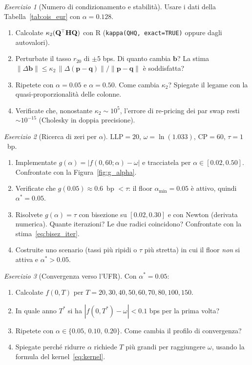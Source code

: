 \documentclass[11pt,a4paper]{article}
\theoremstyle{plain}
\theoremstyle{definition}
\theoremstyle{remark}
\newtheorem{esercizio}{Esercizio}[section]
\newcommand{\LLP}{\ensuremath{\mathrm{LLP}}}
\newcommand{\CP}{\ensuremath{\mathrm{CP}}}
\newcommand{\bfb}{\mathbf{b}}
\newcommand{\bfp}{\mathbf{p}}
\newcommand{\bfq}{\mathbf{q}}
\newcommand{\Hmat}{\mathbf{H}}
\newcommand{\Qmat}{\mathbf{Q}}
\newcommand{\transp}{^{\mskip-1mu\top}}
\newcommand{\abs}[1]{\left\lvert #1 \right\rvert}
\begin{document}
\begin{esercizio}[Numero di condizionamento e stabilit\`a]
Usare i dati della Tabella~\ref{tab:ois_eur} con $\alpha=0.128$.
\begin{enumerate}[label=(\alph*)]
  \item Calcolate $\kappa_2(\Qmat\transp\Hmat\Qmat)$ con R
        (\texttt{kappa(QHQ, exact=TRUE)} oppure dagli autovalori).
  \item Perturbate il tasso $r_{20}$ di $\pm 5$ bps. Di quanto cambia $\bfb$?
        La stima $\|\Delta\bfb\| \le \kappa_2\,\|\Delta(\bfp-\bfq)\|/\|\bfp-\bfq\|$
        \`e soddisfatta?
  \item Ripetete con $\alpha=0.05$ e $\alpha=0.50$. Come cambia $\kappa_2$?
        Spiegate il legame con la quasi-proporzionalità delle colonne.
  \item Verificate che, nonostante $\kappa_2\sim 10^5$, l'errore di re-pricing dei
        par swap resti $\sim 10^{-15}$ (Cholesky in doppia precisione).
\end{enumerate}
\end{esercizio}

\begin{esercizio}[Ricerca di zeri per $\alpha$]
$\LLP=20$, $\omega=\ln(1.033)$, $\CP=60$, $\tau=1$~bp.
\begin{enumerate}[label=(\alph*)]
  \item Implementate $g(\alpha) = \abs{f(0,60;\alpha) - \omega}$ e tracciatela
        per $\alpha \in [0.02, 0.50]$. Confrontate con la Figura~\ref{fig:g_alpha}.
  \item Verificate che $g(0.05)\approx 0.6$~bp $<\tau$: il floor $\alpha_{\min}=0.05$
        è attivo, quindi $\alpha^*=0.05$.
  \item Risolvete $g(\alpha)=\tau$ con bisezione su $[0.02,0.30]$ e con Newton
        (derivata numerica). Quante iterazioni? Le due radici coincidono?
        Confrontate con la stima~\eqref{eq:bisez_iter}.
  \item Costruite uno scenario (tassi più ripidi o $\tau$ più stretta) in cui il
        floor \emph{non} si attiva e $\alpha^*>0.05$.
\end{enumerate}
\end{esercizio}

\begin{esercizio}[Convergenza verso l'UFR]
Con $\alpha^*=0.05$:
\begin{enumerate}[label=(\alph*)]
  \item Calcolate $f(0,T)$ per $T=20,30,40,50,60,70,80,100,150$.
  \item In quale anno $T^*$ si ha $|f(0,T^*) - \omega| < 0.1$ bps per la prima volta?
  \item Ripetete con $\alpha \in \{0.05,\,0.10,\,0.20\}$.
        Come cambia il profilo di convergenza?
  \item Spiegate perch\'e ridurre $\alpha$ richiede $T$ pi\`u grandi per
        raggiungere $\omega$, usando la formula del kernel~\eqref{eq:kernel}.
\end{enumerate}
\end{esercizio}
\end{document}
